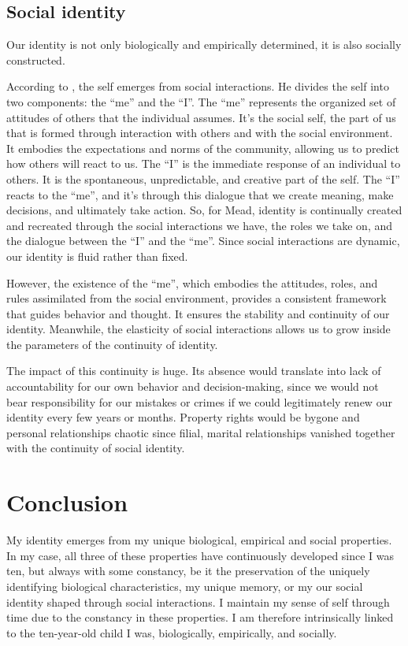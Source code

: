 \documentclass[a4paper,english,12pt]{scrartcl}
\begin{document}
\subsection{Social identity}

Our identity is not only biologically and empirically
determined, it is also socially constructed.

According to \textcite{Mead1934MindSA}, the self emerges from social
interactions. He divides the self into two components: the ``me''
and the ``I''. The ``me'' represents the organized set of attitudes
of others that the individual assumes. It's the social self, the part
of us that is formed through interaction with others and with the
social environment. It embodies the expectations and norms of the
community, allowing us to predict how others will react to us. The
``I'' is the immediate response of an individual to others. It is
the spontaneous, unpredictable, and creative part of the self. The
``I'' reacts to the ``me'', and it's through this dialogue that
we create meaning, make decisions, and ultimately take action. So,
for Mead, identity is continually created and recreated through the
social interactions we have, the roles we take on, and the dialogue
between the ``I'' and the ``me''. Since social interactions are
dynamic, our identity is fluid rather than fixed.

However, the existence of the ``me'', which embodies the attitudes,
roles, and rules assimilated from the social environment, provides
a consistent framework that guides behavior and thought. It ensures
the stability and continuity of our identity. Meanwhile, the elasticity
of social interactions allows us to grow inside the parameters of
the continuity of identity.

The impact of this continuity is huge. Its absence would translate
into lack of accountability for our own behavior and decision-making,
since we would not bear responsibility for our mistakes or crimes
if we could legitimately renew our identity every few years or
months. Property rights would be bygone and personal relationships chaotic
since filial, marital relationships vanished together with the continuity
of social identity.

\section{Conclusion}

My identity emerges from my unique biological, empirical and social
properties. In my case, all three of these properties have continuously
developed since I was ten, but always with some constancy, be it the
preservation of the uniquely identifying biological characteristics,
my unique memory, or my our
social identity shaped through social interactions. I maintain my
sense of self through time due to the constancy in these properties.
I am therefore intrinsically linked to the ten-year-old child I was,
biologically, empirically, and socially.

\printbibliography
\end{document}
